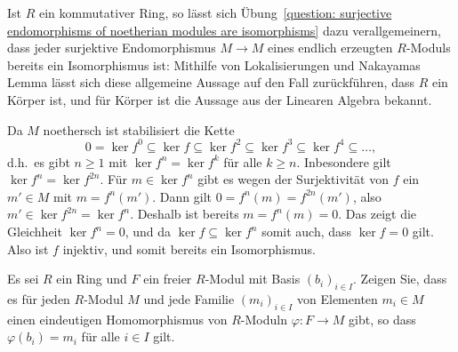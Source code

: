 \begin{remark*}
  Ist $R$ ein kommutativer Ring, so lässt sich Übung~\ref{question: surjective endomorphisms of noetherian modules are isomorphisms} dazu verallgemeinern, dass jeder surjektive Endomorphismus $M \to M$ eines endlich erzeugten $R$-Moduls bereits ein Isomorphismus ist:
  Mithilfe von Lokalisierungen und Nakayamas Lemma lässt sich diese allgemeine Aussage auf den Fall zurückführen, dass $R$ ein Körper ist, und für Körper ist die Aussage aus der Linearen Algebra bekannt.
\end{remark*}


\begin{solution}
  Da $M$ noethersch ist stabilisiert die Kette
  \[
              0
    =         \ker f^0
    \subseteq \ker f
    \subseteq \ker f^2
    \subseteq \ker f^3
    \subseteq \ker f^4
    \subseteq \dotso,
  \]
  d.h.\ es gibt $n \geq 1$ mit $\ker f^n = \ker f^k$ für alle $k \geq n$.
  Inbesondere gilt $\ker f^n = \ker f^{2n}$.
  Für $m \in \ker f^n$ gibt es wegen der Surjektivität von $f$ ein $m' \in M$ mit $m = f^n(m')$.
  Dann gilt $0 = f^n(m) = f^{2n}(m')$, also $m' \in \ker f^{2n} = \ker f^n$.
  Deshalb ist bereits $m = f^n(m) = 0$.
  Das zeigt die Gleichheit $\ker f^n = 0$, und da $\ker f \subseteq \ker f^n$ somit auch, dass $\ker f = 0$ gilt.
  Also ist $f$ injektiv, und somit bereits ein Isomorphismus.
\end{solution}


\begin{question}
  Es sei $R$ ein Ring und $F$ ein freier $R$-Modul mit Basis $(b_i)_{i \in I}$.
  Zeigen Sie, dass es für jeden $R$-Modul $M$ und jede Familie $(m_i)_{i \in I}$ von Elementen $m_i \in M$ einen eindeutigen Homomorphismus von $R$-Moduln $\varphi \colon F \to M$ gibt, so dass $\varphi(b_i) = m_i$ für alle $i \in I$ gilt.
\end{question}


